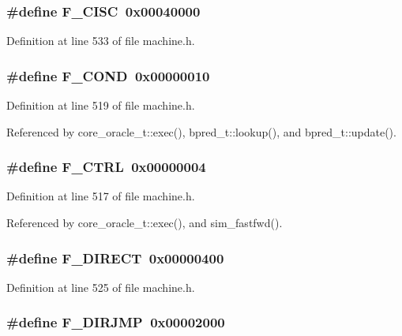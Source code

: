 \subsubsection[{F\_\-CISC}]{\setlength{\rightskip}{0pt plus 5cm}\#define F\_\-CISC~0x00040000}\label{machine_8h_2a27f6d30716d2e7aca6bdb8d798c46c}




Definition at line 533 of file machine.h.
\subsubsection[{F\_\-COND}]{\setlength{\rightskip}{0pt plus 5cm}\#define F\_\-COND~0x00000010}\label{machine_8h_bfe46b85c1701b4a87f12f7e62f2fa09}




Definition at line 519 of file machine.h.

Referenced by core\_\-oracle\_\-t::exec(), bpred\_\-t::lookup(), and bpred\_\-t::update().
\subsubsection[{F\_\-CTRL}]{\setlength{\rightskip}{0pt plus 5cm}\#define F\_\-CTRL~0x00000004}\label{machine_8h_366552bee0ef835c75db8fedf12c11f7}




Definition at line 517 of file machine.h.

Referenced by core\_\-oracle\_\-t::exec(), and sim\_\-fastfwd().
\subsubsection[{F\_\-DIRECT}]{\setlength{\rightskip}{0pt plus 5cm}\#define F\_\-DIRECT~0x00000400}\label{machine_8h_b0eb5429d9940b9a3934fcff0b779223}




Definition at line 525 of file machine.h.
\subsubsection[{F\_\-DIRJMP}]{\setlength{\rightskip}{0pt plus 5cm}\#define F\_\-DIRJMP~0x00002000}\label{machine_8h_10501bd46b1ba51188813786d869aaa5}




